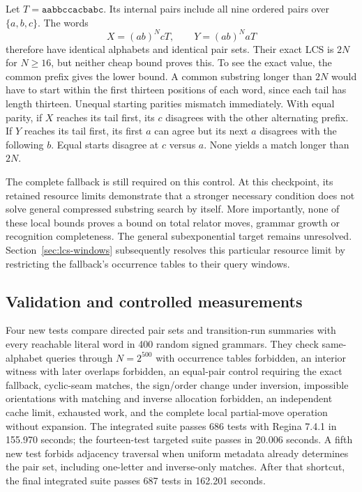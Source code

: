 Let $T=\mathtt{aabbccacbabc}$. Its internal pairs include all nine ordered
pairs over $\{a,b,c\}$. The words
\[
 X=(ab)^N cT,\qquad Y=(ab)^N aT
\]
therefore have identical alphabets and identical pair sets. Their exact
LCS is $2N$ for $N\ge16$, but neither cheap bound proves this.
To see the exact value, the common prefix gives the lower bound. A common
substring longer than $2N$ would have to start within the first thirteen
positions of each word, since each tail has length thirteen. Unequal
starting parities mismatch immediately. With equal parity, if $X$ reaches
its tail first, its $c$ disagrees with the other alternating prefix. If
$Y$ reaches its tail first, its first $a$ can agree but its next $a$
disagrees with the following $b$. Equal starts disagree at $c$ versus $a$.
None yields a match longer than $2N$.

The complete fallback is still required on this control. At this checkpoint,
its retained resource limits demonstrate that a stronger necessary condition does not
solve general compressed substring search by itself. More importantly,
none of these local bounds proves a bound on total relator moves, grammar
growth or recognition completeness. The general subexponential target
remains unresolved.
Section~\ref{sec:lcs-windows} subsequently resolves this particular resource
limit by restricting the fallback's occurrence tables to their query windows.

\subsection{Validation and controlled measurements}

Four new tests compare directed pair sets and transition-run summaries
with every reachable literal word in 400 random signed grammars. They check
same-alphabet queries through $N=2^{500}$ with occurrence tables forbidden,
an interior witness with later overlaps forbidden, an equal-pair control
requiring the exact fallback, cyclic-seam matches, the sign/order change
under inversion, impossible orientations with matching and inverse allocation
forbidden, an independent cache limit, exhausted work, and the complete
local partial-move operation without expansion. The integrated suite passes
686 tests with Regina 7.4.1 in 155.970 seconds; the fourteen-test targeted
suite passes in 20.006 seconds. A fifth new test forbids adjacency
traversal when uniform metadata already determines the pair set, including
one-letter and inverse-only matches. After that shortcut, the final
integrated suite passes 687 tests in 162.201 seconds.

